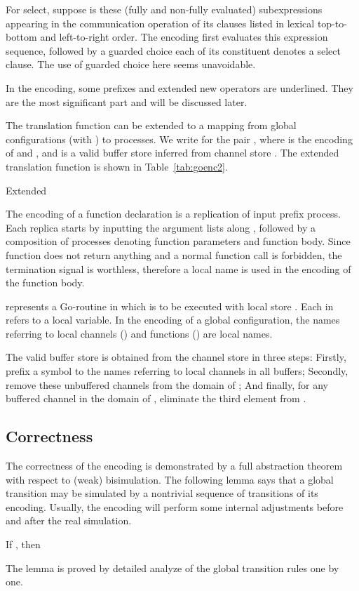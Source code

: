 \documentclass[runningheads, envcountsame, a4paper]{llncs}
\begin{document}
For select, suppose  is these (fully and non-fully evaluated) subexpressions appearing
in the communication operation of its clauses listed in lexical top-to-bottom and left-to-right order.
The encoding first evaluates this expression sequence, followed by a guarded choice each of its constituent denotes a select clause.
The use of guarded choice here seems unavoidable.

In the encoding, some prefixes and extended new operators are underlined.
They are the most significant part and will be discussed later.

The translation function can be extended to a mapping from global configurations (with ) to  processes.
We write  for the pair , where  is the encoding of  and , and  is a valid buffer store inferred from channel store .
The extended translation function is shown in Table~\ref{tab:goenc2}.

\begin{table}

\caption{Extended  }
\label{tab:goenc2}
\end{table}

The encoding of a function declaration is a replication of input prefix process.
Each replica starts by inputting the argument lists along , followed by a composition of processes
denoting function parameters and function body.
Since function does not return anything and a normal function call is forbidden, the termination signal
is worthless, therefore a local name  is used in the encoding of the function body.

 represents a Go-routine in which  is to be executed with local store .
Each  in  refers to a local variable.
In the encoding of a global configuration, the names referring to local channels ()
and functions () are local names.

The valid buffer store  is obtained from the channel store  in three steps:
Firstly, prefix a  symbol to the names referring to local channels in all buffers;
Secondly, remove these unbuffered channels from the domain of ;
And finally, for any buffered channel  in the domain of , eliminate the third element  from .



\subsection{Correctness}

The correctness of the encoding is demonstrated by a full abstraction theorem with respect to (weak) bisimulation.
The following lemma says that a global transition may be simulated by a nontrivial sequence of transitions of its encoding.
Usually, the encoding will perform some internal adjustments before and after the real simulation.
\begin{lemma}
  If , then 
  \label{lem:gocomp}
\end{lemma}
The lemma is proved by detailed analyze of the global transition rules one by one.
\end{document}
